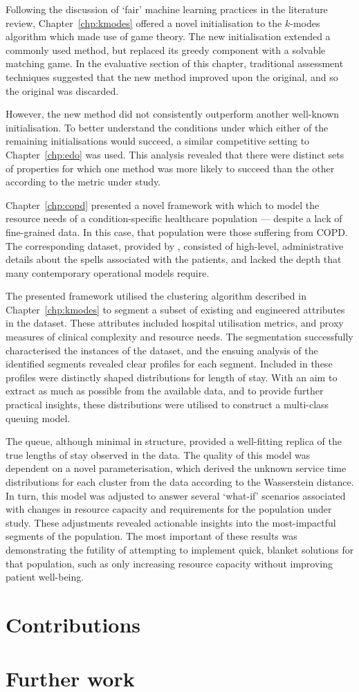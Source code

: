 Following the discussion of `fair' machine learning practices in the literature
review, Chapter~\ref{chp:kmodes} offered a novel initialisation to the
\(k\)-modes algorithm which made use of game theory. The new initialisation
extended a commonly used method, but replaced its greedy component with a
solvable matching game. In the evaluative section of this chapter, traditional
assessment techniques suggested that the new method improved upon the original,
and so the original was discarded.

However, the new method did not consistently outperform another well-known
initialisation. To better understand the conditions under which either of the
remaining initialisations would succeed, a similar competitive setting to
Chapter~\ref{chp:edo} was used. This analysis revealed that there were distinct
sets of properties for which one method was more likely to succeed than the
other according to the metric under study.

Chapter~\ref{chp:copd} presented a novel framework with which to model the
resource needs of a condition-specific healthcare population --- despite a lack
of fine-grained data. In this case, that population were those suffering from
COPD. The corresponding dataset, provided by \ctmuhb, consisted of high-level,
administrative details about the spells associated with the patients, and lacked
the depth that many contemporary operational models require.

The presented framework utilised the clustering algorithm described in
Chapter~\ref{chp:kmodes} to segment a subset of existing and engineered
attributes in the dataset. These attributes included hospital utilisation
metrics, and proxy measures of clinical complexity and resource needs. The
segmentation successfully characterised the instances of the dataset, and the
ensuing analysis of the identified segments revealed clear profiles for each
segment. Included in these profiles were distinctly shaped distributions for
length of stay. With an aim to extract as much as possible from the available
data, and to provide further practical insights, these distributions were
utilised to construct a multi-class queuing model.

The queue, although minimal in structure, provided a well-fitting replica of the
true lengths of stay observed in the data. The quality of this model was
dependent on a novel parameterisation, which derived the unknown service time
distributions for each cluster from the data according to the Wasserstein
distance. In turn, this model was adjusted to answer several `what-if' scenarios
associated with changes in resource capacity and requirements for the population
under study. These adjustments revealed actionable insights into the
most-impactful segments of the population. The most important of these results
was demonstrating the futility of attempting to implement quick, blanket
solutions for that population, such as only increasing resource capacity without
improving patient well-being.

\section{Contributions}



\section{Further work}
